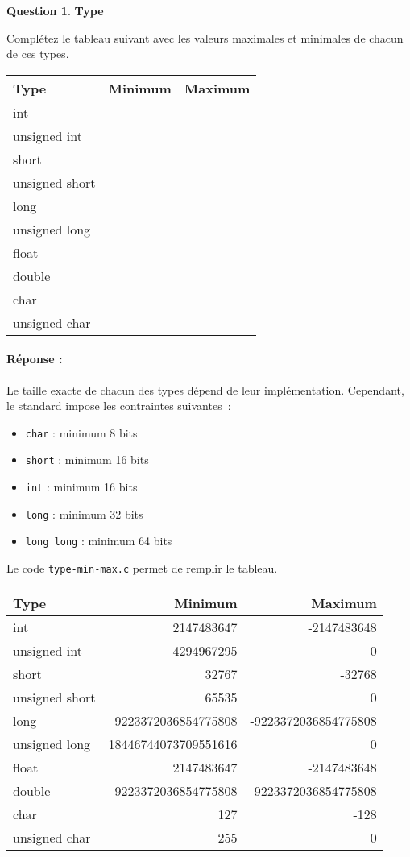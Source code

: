\documentclass[11pt,a4paper,dvipsnames]{article}
\theoremstyle{definition}%
\newtheorem{Q}{Question}[] %
\newcommand{\reponse}[1]{%
	\ifthenelse {\boolean{corrige}} {\paragraph{Réponse :}
    \color{darkblue} #1 \color{black}} {}
 }
\begin{document}
\begin{Q} \textbf{Type}

Complétez le tableau suivant avec les valeurs maximales et minimales de chacun de ces types.
\begin{center}
	\begin{tabular}{|l|p{5cm}|p{5cm}|} \hline
	Type & Minimum & Maximum \\ \hline
	int & & \\ \hline
	unsigned int & & \\ \hline
	short & & \\ \hline
	unsigned short & & \\ \hline
	long & & \\ \hline
	unsigned long & & \\ \hline
	float & & \\ \hline
	double & & \\ \hline
	char & & \\ \hline
	unsigned char & & \\ \hline
	\end{tabular}
\end{center}

\reponse{
Le taille exacte de chacun des types dépend de leur implémentation.
Cependant, le standard impose les contraintes suivantes~:

\begin{itemize}
	\item \texttt{char} : minimum 8 bits
	\item \texttt{short} : minimum 16 bits
	\item \texttt{int} : minimum 16 bits
	\item \texttt{long} : minimum 32 bits
	\item \texttt{long long} : minimum 64 bits
\end{itemize}

Le code \texttt{type-min-max.c} permet de remplir le tableau.

\begin{center}
	\begin{tabular}{|l|r|r|} \hline
	Type & Minimum & Maximum \\ \hline
	int & 2147483647 & -2147483648 \\ \hline
	unsigned int & 4294967295 & 0 \\ \hline
	short & 32767 & -32768 \\ \hline
	unsigned short & 65535 & 0 \\ \hline
	long & 9223372036854775808 & -9223372036854775808 \\ \hline
	unsigned long & 18446744073709551616 & 0 \\ \hline
	float & 2147483647 & -2147483648 \\ \hline
	double & 9223372036854775808 & -9223372036854775808 \\ \hline
	char & 127 & -128 \\ \hline
	unsigned char & 255 & 0 \\ \hline
	\end{tabular}
\end{center}
}

\end{Q}
\end{document}
